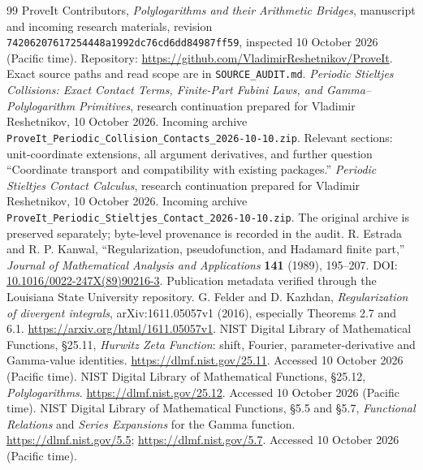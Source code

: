 \documentclass[11pt]{article}
\theoremstyle{definition}\newtheorem{definition}[theorem]{Definition}
\theoremstyle{remark}\newtheorem{remark}[theorem]{Remark}
\newcommand{\pin}{\texttt{74206207617254448a1992dc76cd6dd84987ff59}}
\begin{document}
\clearpage
\begin{thebibliography}{99}
 ProveIt Contributors, \emph{Polylogarithms and their Arithmetic Bridges}, manuscript and incoming research materials, revision \pin, inspected 10 October 2026 (Pacific time). Repository: \url{https://github.com/VladimirReshetnikov/ProveIt}. Exact source paths and read scope are in \texttt{SOURCE\_AUDIT.md}.
 \emph{Periodic Stieltjes Collisions: Exact Contact Terms, Finite-Part Fubini Laws, and Gamma--Polylogarithm Primitives}, research continuation prepared for Vladimir Reshetnikov, 10 October 2026. Incoming archive \texttt{ProveIt\_Periodic\_Collision\_Contacts\_2026-10-10.zip}. Relevant sections: unit-coordinate extensions, all argument derivatives, and further question ``Coordinate transport and compatibility with existing packages.''
 \emph{Periodic Stieltjes Contact Calculus}, research continuation prepared for Vladimir Reshetnikov, 10 October 2026. Incoming archive \texttt{ProveIt\_Periodic\_Stieltjes\_Contact\_2026-10-10.zip}. The original archive is preserved separately; byte-level provenance is recorded in the audit.
 R. Estrada and R. P. Kanwal, ``Regularization, pseudofunction, and Hadamard finite part,'' \emph{Journal of Mathematical Analysis and Applications} \textbf{141} (1989), 195--207. DOI: \href{https://doi.org/10.1016/0022-247X(89)90216-3}{10.1016/0022-247X(89)90216-3}. Publication metadata verified through the Louisiana State University repository.
 G. Felder and D. Kazhdan, \emph{Regularization of divergent integrals}, arXiv:1611.05057v1 (2016), especially Theorems 2.7 and 6.1. \url{https://arxiv.org/html/1611.05057v1}.
 NIST Digital Library of Mathematical Functions, \S25.11, \emph{Hurwitz Zeta Function}: shift, Fourier, parameter-derivative and Gamma-value identities. \url{https://dlmf.nist.gov/25.11}. Accessed 10 October 2026 (Pacific time).
 NIST Digital Library of Mathematical Functions, \S25.12, \emph{Polylogarithms}. \url{https://dlmf.nist.gov/25.12}. Accessed 10 October 2026 (Pacific time).
 NIST Digital Library of Mathematical Functions, \S5.5 and \S5.7, \emph{Functional Relations} and \emph{Series Expansions} for the Gamma function. \url{https://dlmf.nist.gov/5.5}; \url{https://dlmf.nist.gov/5.7}. Accessed 10 October 2026 (Pacific time).
\end{thebibliography}
\end{document}

